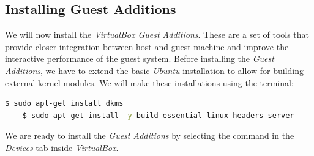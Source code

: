 \subsection*{Installing Guest Additions}
We will now install the \textit{VirtualBox Guest Additions}. These are a set of tools that provide closer integration between host and guest machine and improve the interactive performance of the guest system. Before installing the \textit{Guest Additions}, we have to extend the basic \textit{Ubuntu} installation to allow for building external kernel modules. We will make these installations using the terminal:
%
\vspace{0.2cm}\begin{lstlisting}[language=bash]
    $ sudo apt-get install dkms
    $ sudo apt-get install -y build-essential linux-headers-server
\end{lstlisting}\vspace{0.2cm}
%
We are ready to install the \textit{Guest Additions} by selecting the command in the \textit{Devices} tab inside \textit{VirtualBox}.
